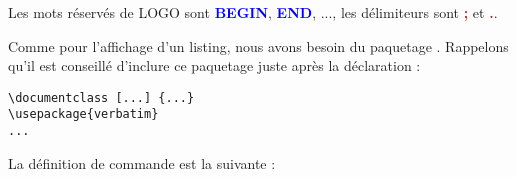 Les mots réservés de LOGO sont \colorbox{gray!6}{\ttfamily\textcolor{blue}{\bf BEGIN}}, \colorbox{gray!6}{\ttfamily\textcolor{blue}{\bf END}}, ..., les délimiteurs sont \colorbox{gray!6}{\ttfamily\textcolor{brown}{\bf ;}} et \colorbox{gray!6}{\ttfamily\textcolor{brown}{\bf .}}.

Comme pour l'affichage d'un listing, nous avons besoin du paquetage . Rappelons qu'il est conseillé d'inclure ce paquetage juste après la déclaration  :

{\singlespacing
\begin{verbatim}
\documentclass [...] {...}
\usepackage{verbatim}
...
\end{verbatim}
}

La définition de commande  est la suivante :






